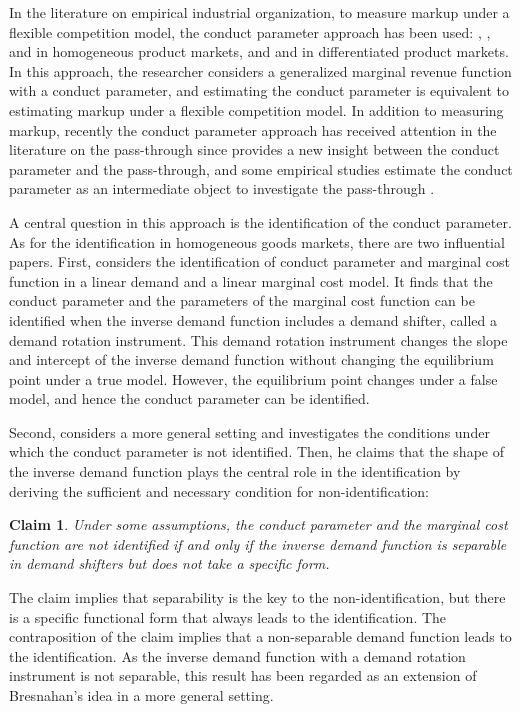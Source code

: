 \documentclass[11pt, a4paper]{article}
\newtheorem*{claim*}{Claim}
\begin{document}
In the literature on empirical industrial organization, to measure markup under a flexible competition model, the conduct parameter approach has been used: \citet{porterStudy1983}, \citet{genesoveTesting1998}, and \citet{okazakiExcess2022} in homogeneous product markets, and \cite{millerUnderstanding2017} and \citet{cilibertoDoes2014} in differentiated product markets.
In this approach, the researcher considers a generalized marginal revenue function with a conduct parameter, and estimating the conduct parameter is equivalent to estimating markup under a flexible competition model.
In addition to measuring markup, recently the conduct parameter approach has received attention in the literature on the pass-through since \citet{weylPassThrough2013} provides a new insight between the conduct parameter and the pass-through, and some empirical studies estimate the conduct parameter as an intermediate object to investigate the pass-through \citep{millerPassthrough2017}.

A central question in this approach is the identification of the conduct parameter.
As for the identification in homogeneous goods markets, there are two influential papers.
First, \citet{bresnahanOligopoly1982} considers the identification of conduct parameter and marginal cost function in a linear demand and a linear marginal cost model.
It finds that the conduct parameter and the parameters of the marginal cost function can be identified when the inverse demand function includes a demand shifter, called a demand rotation instrument. 
This demand rotation instrument changes the slope and intercept of the inverse demand function without changing the equilibrium point under a true model.
However, the equilibrium point changes under a false model, and hence the conduct parameter can be identified.

Second, \citet{lauIdentifying1982} considers a more general setting and investigates the conditions under which the conduct parameter is not identified.
Then, he claims that the shape of the inverse demand function plays the central role in the identification by deriving the sufficient and necessary condition for non-identification:
\begin{claim*}
    Under some assumptions, the conduct parameter and the marginal cost function are not identified if and only if the inverse demand function is separable in demand shifters but does not take a specific form.
\end{claim*}
The claim implies that separability is the key to the non-identification, but there is a specific functional form that always leads to the identification.
The contraposition of the claim implies that a non-separable demand function leads to the identification.
As the inverse demand function with a demand rotation instrument is not separable, this result has been regarded as an extension of Bresnahan's idea in a more general setting.
\end{document}
